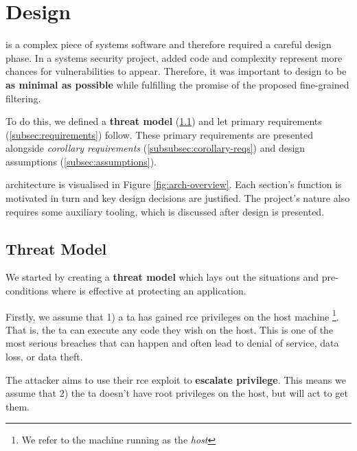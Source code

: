 \section{Design} \label{sec:design}

%
        

\af is a complex piece of systems software and therefore required a
careful design phase. In a systems security project, added code and complexity
represent more chances for vulnerabilities to appear. Therefore, it was
important to design \af to be \textbf{as minimal as possible} while fulfilling
the promise of the proposed fine-grained filtering.

To do this, we defined a \textbf{threat model} (\ref{subsec:threat-model}) and
let primary requirements (\ref{subsec:requirements}) follow. These primary
requirements are presented alongside \textit{corollary requirements}
(\ref{subsubsec:corollary-reqs}) and design assumptions
(\ref{subsec:assumptions}).

\afg architecture is visualised in Figure \ref{fig:arch-overview}. Each
section's function is motivated in turn and key design decisions are justified.
The project's nature also requires some auxiliary tooling, which is discussed
after \afg design is presented.

\subsection{Threat Model}\label{subsec:threat-model}

We started by creating a \textbf{threat model} which lays out the situations and
pre-conditions where \af is effective at protecting an application.

Firstly, we assume that 1) a \ac{ta} has gained \ac{rce} privileges on the host
machine \footnote{We refer to the machine running \af as the \textit{host
}}. That is, the \ac{ta} can execute any code they wish on the host. This is one of the most serious breaches that can happen and often
lead to denial of service, data loss, or data theft.%

The attacker aims to use their \ac{rce} exploit to \textbf{escalate privilege}. This
means we assume that 2) the \ac{ta} doesn't have root privileges on the host,
but will act to get them.

